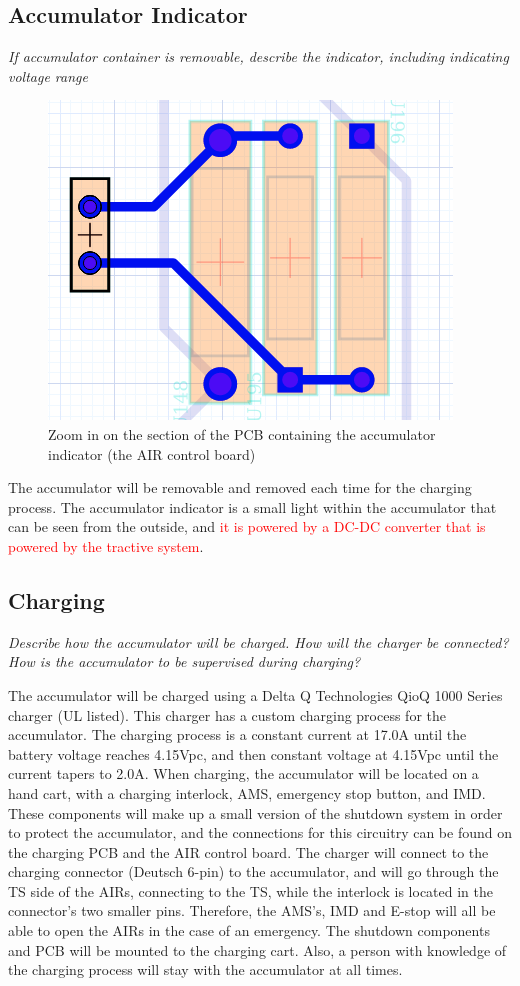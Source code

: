 \documentclass{article}
\begin{document}

\subsection{Accumulator Indicator}

    \textit{If accumulator container is removable, describe the indicator, including indicating voltage range}

        \begin{figure}[H]
            \centering
            \includegraphics[width = 0.3 \textwidth]{accuindicator}
            \caption{Zoom in on the section of the PCB containing the accumulator indicator (the AIR control board)}
            \label{aindicatorPCB}
        \end{figure}

    The accumulator will be removable and removed each time for the charging process. The accumulator indicator is a small light within the accumulator that can be seen from the outside, and \textcolor{red}{it is powered by a DC-DC converter that is powered by the tractive system}.

\subsection{Charging}

\textit{Describe how the accumulator will be charged. How will the charger be connected? How is the accumulator to be supervised during charging?}

The accumulator will be charged using a Delta Q Technologies QioQ 1000 Series charger (UL listed). This charger has a custom charging process for the accumulator. The charging process is a constant current at 17.0A until the battery voltage reaches 4.15Vpc, and then constant voltage at 4.15Vpc until the current tapers to 2.0A. When charging, the accumulator will be located on a hand cart, with a charging interlock, AMS, emergency stop button, and IMD. These components will make up a small version of the shutdown system in order to protect the accumulator, and the connections for this circuitry can be found on the charging PCB and the AIR control board. The charger will connect to the charging connector (Deutsch 6-pin) to the accumulator, and will go through the TS side of the AIRs, connecting to the TS, while the interlock is located in the connector's two smaller pins. Therefore, the AMS's, IMD and E-stop will all be able to open the AIRs in the case of an emergency. The shutdown components and PCB will be mounted to the charging cart. Also, a person with knowledge of the charging process will stay with the accumulator at all times.
\end{document}
